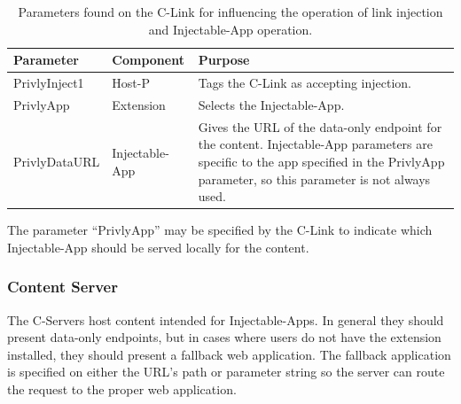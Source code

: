 \documentclass[letterpaper,twocolumn,10pt]{article}
\begin{document}
\begin{table}
    \begin{tabular}{|l|l|p{10.8cm}|}
        \hline
        \textbf{Parameter}                   & \textbf{Component}              & \textbf{Purpose}                                                                                                                                                                                            \\ \hline
        PrivlyInject1               & Host-P              & Tags the C-Link as accepting injection.                                                                                                                                                      \\ \hline
        PrivlyApp & Extension & Selects the Injectable-App.                                                                                                                                                         \\ \hline
        PrivlyDataURL               & Injectable-App & Gives the URL of the data-only endpoint for the content. Injectable-App parameters are specific to the app specified in the PrivlyApp parameter, so this parameter is not always used.                                                                                                                                           \\ \hline
    \end{tabular}
    \caption{Parameters found on the C-Link for influencing the operation of link injection and Injectable-App operation.}
    \label{tab:parameters}
\end{table}

The parameter ``PrivlyApp'' may be specified by the 
C-Link to indicate 
which Injectable-App should be served locally for the content.

\subsubsection{Content Server} \label{sec:privly_content_server}

The C-Servers host content intended for Injectable-Apps. In general they should 
present data-only endpoints, but in cases where users do not have the extension 
installed, they should present a fallback web application. The fallback application
is specified on either the URL's path or parameter string so the server can route
the request to the proper web application.
\end{document}
